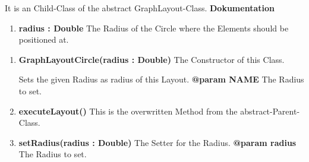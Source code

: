 				It is an Child-Class of the abstract GraphLayout-Class.
				\textbf{Dokumentation}\newline
				\begin{enumerate}[-]
					\item{
						\textbf{radius : Double} \newline
						The Radius of the Circle where the Elements should be positioned at.
					}
				\end{enumerate}
				\begin{enumerate}[+]
					\item{
						\textbf{GraphLayoutCircle(radius : Double)} \newline
						The Constructor of this Class.
						
						Sets the given Radius as radius of this Layout.
						\newline
						\textbf{@param NAME}
						The Radius to set.
						\newline
					}
					\item{
						\textbf{executeLayout()} \newline
						This is the overwritten Method from the abstract-Parent-Class.
						\newline
					}
					\item{
						\textbf{setRadius(radius : Double)} \newline
						The Setter for the Radius.
						\newline
						\textbf{@param radius}
						The Radius to set.
						\newline
					}
				\end{enumerate}
		
			
